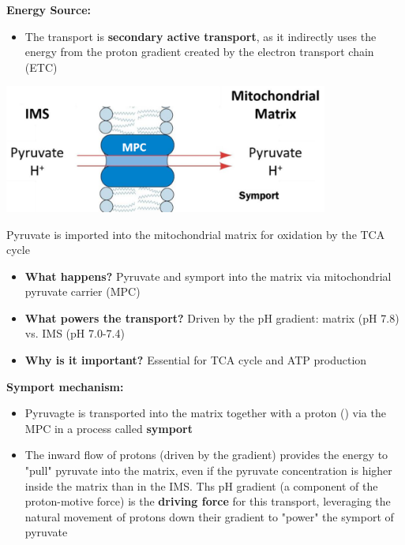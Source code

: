 \documentclass[10pt]{article}
\newcommand{\proton}{\text{H$^+$}}
\begin{document}
\textbf{Energy Source:}
\begin{itemize}
	\item The transport is \textbf{secondary active transport}, as it indirectly uses the energy from the proton gradient created by the electron transport chain (ETC)
\end{itemize}
\begin{center} 
	\includegraphics*[width=0.8\textwidth]{L3_9.png}
\end{center}
Pyruvate is imported into the mitochondrial matrix for oxidation by the TCA cycle
\begin{itemize}
	\item \textbf{What happens?}  Pyruvate and \proton symport into the matrix via mitochondrial pyruvate carrier (MPC)
	\item \textbf{What powers the transport?}  Driven by the pH gradient: matrix (pH 7.8) vs. IMS (pH 7.0-7.4)
	\item \textbf{Why is it important?}  Essential for TCA cycle and ATP production
\end{itemize}
\textbf{Symport mechanism:}
\begin{itemize}
	\item Pyruvagte is transported into the matrix together with a proton (\proton) via the MPC in a process called \textbf{symport}
	\item The inward flow of protons (driven by the gradient) provides the energy to "pull" pyruvate into the matrix, even if the pyruvate concentration is higher inside the matrix than in the IMS.  Ths pH gradient (a component of the proton-motive force) is the \textbf{driving force} for this transport, leveraging the natural movement of protons down their gradient to "power" the symport of pyruvate
\end{itemize}
\end{document}
